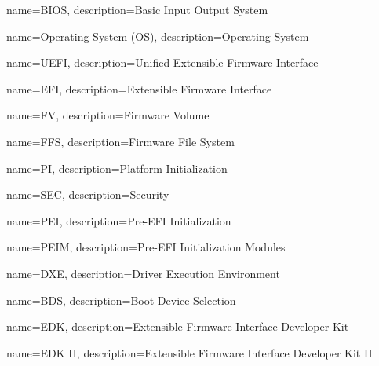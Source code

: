  {
    name=BIOS,
    description={Basic Input Output System
    }
}

 {
    name=Operating System (OS),
    description={Operating System
    }
}

 {
    name=UEFI,
    description={Unified Extensible Firmware Interface
    }
}

 {
    name=EFI,
    description={Extensible Firmware Interface
    }
}


 {
    name=FV,
    description={Firmware Volume
    }
}

 {
    name=FFS,
    description={Firmware File System
    }
}

 {
    name=PI,
    description={Platform Initialization
    }
}

 {
    name=SEC,
    description={Security
    }
}

 {
    name=PEI,
    description={Pre-EFI Initialization
    }
}

 {
    name=PEIM,
    description={Pre-EFI Initialization Modules
    }
}

 {
    name=DXE,
    description={Driver Execution Environment
    }
}


 {
    name=BDS,
    description={Boot Device Selection
    }
}

 {
    name=EDK,
    description={Extensible Firmware Interface Developer Kit
    }
}

 {
    name=EDK II,
    description={Extensible Firmware Interface Developer Kit II
    }
}

